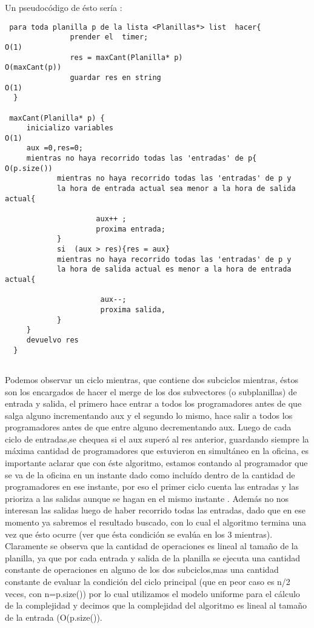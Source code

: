 Un pseudocódigo de ésto serí­a : 
\begin{verbatim}
 para toda planilla p de la lista <Planillas*> list  hacer{
               prender el  timer;                                    O(1)
               res = maxCant(Planilla* p)                            O(maxCant(p))
               guardar res en string                                 O(1)
  }
  
 maxCant(Planilla* p) { 
     inicializo variables                                             O(1)
     aux =0,res=0;		
     mientras no haya recorrido todas las 'entradas' de p{            O(p.size())
            mientras no haya recorrido todas las 'entradas' de p y 
            la hora de entrada actual sea menor a la hora de salida actual{
		  
                     aux++ ;
                     proxima entrada;		
	        }
            si  (aux > res){res = aux}
            mientras no haya recorrido todas las 'entradas' de p y 
            la hora de salida actual es menor a la hora de entrada actual{
			   
                      aux--;				 	
                      proxima salida,
            }
     }	
	 devuelvo res 
  }
	  
\end{verbatim}
Podemos observar un ciclo mientras, que contiene dos subciclos mientras, éstos son los encargados de hacer el merge de los dos subvectores (o subplanillas) de entrada y salida, el primero hace entrar a todos los programadores antes de que salga alguno incrementando aux y el segundo lo mismo, hace salir a todos los programadores antes de que entre alguno decrementando aux. 
\newline
Luego de cada ciclo de entradas,se chequea si el aux superó al res anterior, guardando siempre la máxima cantidad de programadores que estuvieron en simultáneo en la oficina, es importante aclarar que con éste algoritmo, estamos contando al programador que se va de la oficina en un instante dado  como incluí­do dentro de la cantidad de programadores en ese instante, por eso el primer ciclo cuenta las entradas y las prioriza a las salidas aunque se hagan en el mismo instante .
\newline
Además no nos interesan las salidas luego de haber recorrido todas las entradas, dado que en ese momento ya sabremos el resultado buscado, con lo cual el algoritmo termina una vez que ésto ocurre (ver que ésta condición se evalúa en los 3 mientras).
\newline
Claramente se observa que la cantidad de operaciones es lineal al tamaño de la planilla, ya que por cada entrada y salida de la planilla se ejecuta una cantidad constante de operaciones en alguno de los dos subciclos,mas una cantidad constante de evaluar la condición del ciclo principal (que en peor caso es n/2 veces, con n=p.size()) por lo cual utilizamos el modelo uniforme para el cálculo de la complejidad y decimos que la complejidad del algoritmo es lineal al tamaño de la entrada (O(p.size()).
